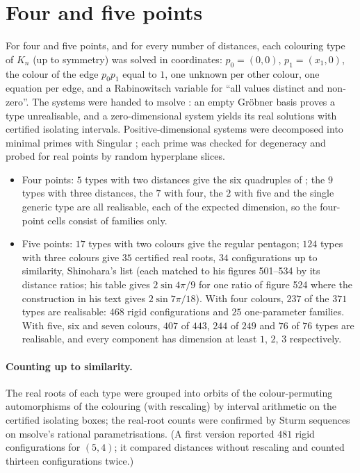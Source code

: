 \documentclass[11pt]{amsart}
\theoremstyle{remark}
\begin{document}
\section{Four and five points}\label{sec:small}

For four and five points, and for every number of distances, each colouring type of $K_n$ (up to symmetry)
was solved in coordinates: $p_0=(0,0)$, $p_1=(x_1,0)$, the colour of the edge $p_0p_1$ equal to $1$, one
unknown per other colour, one equation per edge, and a Rabinowitsch variable for ``all values distinct and
non-zero''. The systems were handed to msolve \cite{msolve}: an empty Gröbner basis proves a type
unrealisable, and a zero-dimensional system yields its real solutions with certified isolating intervals.
Positive-dimensional systems were decomposed into minimal primes with Singular \cite{Singular}; each prime
was checked for degeneracy and probed for real points by random hyperplane slices.

\begin{itemize}
\item Four points: $5$ types with two distances give the six quadruples of \cite{ES}; the $9$ types with
  three distances, the $7$ with four, the $2$ with five and the single generic type are all realisable,
  each of the expected dimension, so the four-point cells consist of families only.
\item Five points: $17$ types with two colours give the regular pentagon; $124$ types with three colours
  give $35$ certified real roots, $34$ configurations up to similarity, Shinohara's list \cite{Sh04} (each
  matched to his figures 501--534 by its distance ratios; his table gives $2\sin4\pi/9$ for one ratio of
  figure 524 where the construction in his text gives $2\sin7\pi/18$). With four colours, $237$ of the
  $371$ types are realisable: $468$ rigid configurations and $25$ one-parameter families. With five, six
  and seven colours, $407$ of $443$, $244$ of $249$ and $76$ of $76$ types are realisable, and every
  component has dimension at least $1$, $2$, $3$ respectively.
\end{itemize}

\paragraph{Counting up to similarity.} The real roots of each type were grouped into orbits of the
colour-permuting automorphisms of the colouring (with rescaling) by interval arithmetic on the certified
isolating boxes; the real-root counts were confirmed by Sturm sequences on msolve's rational
parametrisations. (A first version reported $481$ rigid configurations for $(5,4)$; it compared distances
without rescaling and counted thirteen configurations twice.)
\end{document}
